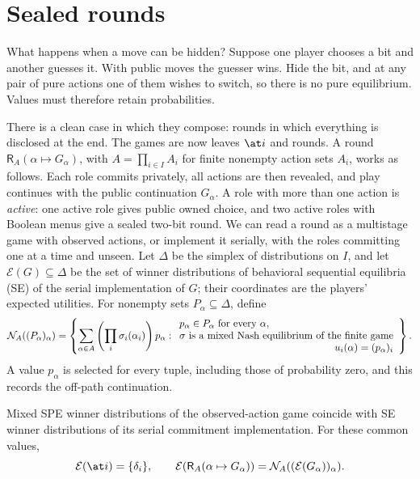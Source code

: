\section{Sealed rounds}\label{sec:sealed-rounds}

What happens when a move can be hidden? Suppose one player chooses a bit and another guesses it. With public moves the guesser wins. Hide the bit, and at any pair of pure actions one of them wishes to switch, so there is no pure equilibrium. Values must therefore retain probabilities.

There is a clean case in which they compose: rounds in which everything is disclosed at the end. The games are now leaves $\at i$ and rounds. A round $\mathsf R_A(\alpha\mapsto G_\alpha)$, with $A=\prod_{i\in I}A_i$ for finite nonempty action sets $A_i$, works as follows. Each role commits privately, all actions are then revealed, and play continues with the public continuation $G_\alpha$. A role with more than one action is \emph{active}: one active role gives public owned choice, and two active roles with Boolean menus give a sealed two-bit round. We can read a round as a multistage game with observed actions, or implement it serially, with the roles committing one at a time and unseen. Let $\Delta$ be the simplex of distributions on $I$, and let $\mathcal E(G)\subseteq\Delta$ be the set of winner distributions of behavioral sequential equilibria (SE) of the serial implementation of $G$; their coordinates are the players' expected utilities. For nonempty sets $P_\alpha\subseteq\Delta$, define
\begin{equation}\label{se:eq:round}
 \mathcal N_A((P_\alpha)_\alpha)=
 \left\{\sum_{\alpha\in A}\left(\prod_i\sigma_i(\alpha_i)\right)p_\alpha:
 \begin{array}{l}
 p_\alpha\in P_\alpha\text{ for every }\alpha,\\
 \sigma\text{ is a mixed Nash equilibrium of the finite game}\\
 \hfill u_i(\alpha)=(p_\alpha)_i
 \end{array}\right\}.
\end{equation}
A value $p_\alpha$ is selected for every tuple, including those of probability zero, and this records the off-path continuation.

\begin{proposition}\label{se:thm:round}
Mixed SPE winner distributions of the observed-action game coincide with SE winner distributions of its serial commitment implementation. For these common values,
\[
 \mathcal E(\at i)=\{\delta_i\},\qquad
 \mathcal E(\mathsf R_A(\alpha\mapsto G_\alpha))=
        \mathcal N_A((\mathcal E(G_\alpha))_\alpha).
\]
\end{proposition}

